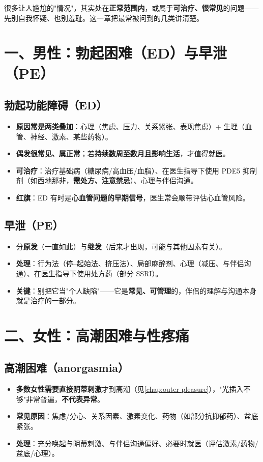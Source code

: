 \documentclass[12pt,UTF8,openany]{ctexbook}
\begin{document}
很多让人尴尬的"情况"，其实处在\textbf{正常范围内}，或属于\textbf{可治疗、很常见}的问题——先别自我怀疑、也别羞耻。这一章把最常被问到的几类讲清楚。

\section{一、男性：勃起困难（ED）与早泄（PE）}

\subsection*{勃起功能障碍（ED）}
\begin{itemize}[leftmargin=2em,itemsep=0.3em]
  \item \textbf{原因常是两类叠加}：心理（焦虑、压力、关系紧张、表现焦虑）+ 生理（血管、神经、激素、某些药物）。
  \item \textbf{偶发很常见、属正常}；若\textbf{持续数周至数月且影响生活}，才值得就医。
  \item \textbf{可治疗}：治疗基础病（糖尿病/高血压/血脂）、在医生指导下使用 PDE5 抑制剂（如西地那非，\textbf{需处方、注意禁忌}）、心理与伴侣沟通。
  \item \textbf{红旗}：ED 有时是\textbf{心血管问题的早期信号}，医生常会顺带评估心血管风险。
\end{itemize}

\subsection*{早泄（PE）}
\begin{itemize}[leftmargin=2em,itemsep=0.3em]
  \item 分\textbf{原发}（一直如此）与\textbf{继发}（后来才出现，可能与其他因素有关）。
  \item \textbf{处理}：行为法（停--起始法、挤压法）、局部麻醉剂、心理（减压、与伴侣沟通）、在医生指导下使用处方药（部分 SSRI）。
  \item \textbf{关键}：别把它当"个人缺陷"——它是\textbf{常见、可管理}的，伴侣的理解与沟通本身就是治疗的一部分。
\end{itemize}

\section{二、女性：高潮困难与性疼痛}

\subsection*{高潮困难（anorgasmia）}
\begin{itemize}[leftmargin=2em,itemsep=0.3em]
  \item \textbf{多数女性需要直接阴蒂刺激}才到高潮（见\ref{chap:outer-pleasure}），"光插入不够"非常普遍，\textbf{不代表异常}。
  \item \textbf{常见原因}：焦虑/分心、关系因素、激素变化、药物（如部分抗抑郁药）、盆底紧张。
  \item \textbf{处理}：充分唤起与阴蒂刺激、与伴侣沟通偏好、必要时就医（评估激素/药物/盆底/心理）。
\end{itemize}
\end{document}
